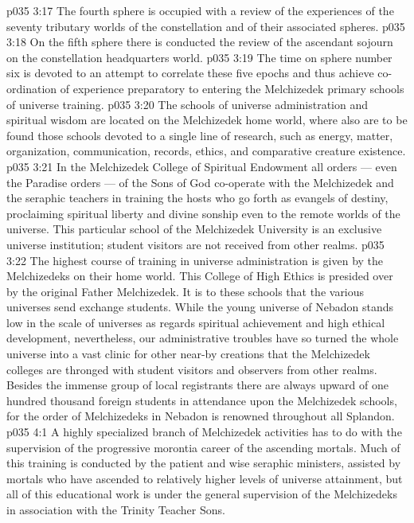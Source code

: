 \vs p035 3:17 \pc {}\bibnobreakspace The fourth sphere is occupied with a review of the experiences of the seventy tributary worlds of the constellation and of their associated spheres.
\vs p035 3:18 \pc {}\bibnobreakspace On the fifth sphere there is conducted the review of the ascendant sojourn on the constellation headquarters world.
\vs p035 3:19 \pc {}\bibnobreakspace The time on sphere number six is devoted to an attempt to correlate these five epochs and thus achieve co\hyp{}ordination of experience preparatory to entering the Melchizedek primary schools of universe training.
\vs p035 3:20 \pc The schools of universe administration and spiritual wisdom are located on the Melchizedek home world, where also are to be found those schools devoted to a single line of research, such as energy, matter, organization, communication, records, ethics, and comparative creature existence.
\vs p035 3:21 In the Melchizedek College of Spiritual Endowment all orders --- even the Paradise orders --- of the Sons of God co\hyp{}operate with the Melchizedek and the seraphic teachers in training the hosts who go forth as evangels of destiny, proclaiming spiritual liberty and divine sonship even to the remote worlds of the universe. This particular school of the Melchizedek University is an exclusive universe institution; student visitors are not received from other realms.
\vs p035 3:22 The highest course of training in universe administration is given by the Melchizedeks on their home world. This College of High Ethics is presided over by the original Father Melchizedek. It is to these schools that the various universes send exchange students. While the young universe of Nebadon stands low in the scale of universes as regards spiritual achievement and high ethical development, nevertheless, our administrative troubles have so turned the whole universe into a vast clinic for other near\hyp{}by creations that the Melchizedek colleges are thronged with student visitors and observers from other realms. Besides the immense group of local registrants there are always upward of one hundred thousand foreign students in attendance upon the Melchizedek schools, for the order of Melchizedeks in Nebadon is renowned throughout all Splandon.
\vs p035 4:1 A highly specialized branch of Melchizedek activities has to do with the supervision of the progressive morontia career of the ascending mortals. Much of this training is conducted by the patient and wise seraphic ministers, assisted by mortals who have ascended to relatively higher levels of universe attainment, but all of this educational work is under the general supervision of the Melchizedeks in association with the Trinity Teacher Sons.
